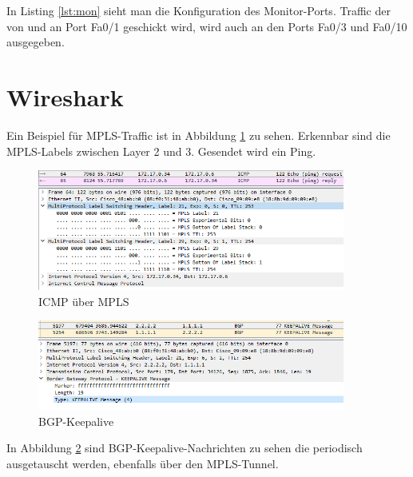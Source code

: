 In Listing \ref{lst:mon} sieht man die Konfiguration des Monitor-Ports. Traffic der von und an Port Fa0/1 geschickt wird, wird auch an den Ports Fa0/3 und Fa0/10 ausgegeben.

\section{Wireshark}

Ein Beispiel für \ac{MPLS}-Traffic ist in Abbildung \ref{img:icmp} zu sehen. Erkennbar sind die MPLS-Labels zwischen Layer 2 und 3. Gesendet wird ein Ping.

\begin{figure}[H]
	\centering
	\includegraphics[width=0.9\textwidth]{img/icmp_wireshark.png}
	\caption{ICMP über MPLS}
	\label{img:icmp}
\end{figure}

\begin{figure}[H]
	\centering
	\includegraphics[width=0.9\textwidth]{img/bgp_wireshark.png}
	\caption{BGP-Keepalive}
	\label{img:bgp}
\end{figure}

In Abbildung \ref{img:bgp} sind \ac{BGP}-Keepalive-Nachrichten zu sehen die periodisch ausgetauscht werden, ebenfalls über den \ac{MPLS}-Tunnel.